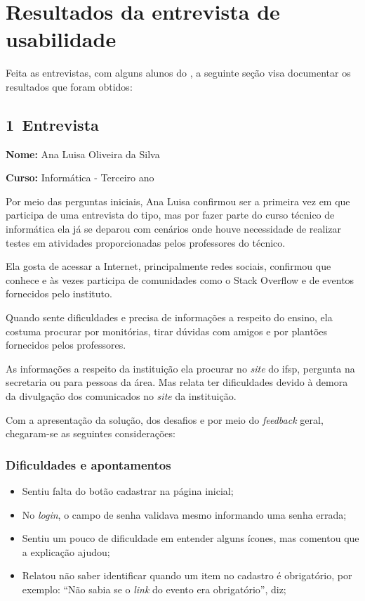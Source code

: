\chapter{Resultados da entrevista de usabilidade}
\label{resultado_entrevista}
Feita as entrevistas, com alguns alunos do , a seguinte seção visa documentar os resultados que foram obtidos:

\section{1\textordfeminine \, Entrevista}

\textbf{Nome:} Ana Luisa Oliveira da Silva

\textbf{Curso:} Informática - Terceiro ano

Por meio das perguntas iniciais, Ana Luisa confirmou ser a primeira vez em que participa de uma entrevista do tipo, mas por fazer parte do curso técnico de informática ela já se deparou com cenários onde houve necessidade de realizar testes em atividades proporcionadas pelos professores do técnico.

Ela gosta de acessar a Internet, principalmente redes sociais, confirmou que conhece e às vezes participa de comunidades como o Stack Overflow e de eventos fornecidos pelo instituto.

Quando sente dificuldades e precisa de informações a respeito do ensino, ela costuma procurar por monitórias, tirar dúvidas com amigos e por plantões fornecidos pelos professores.

As informações a respeito da instituição ela procurar no \textit{site} do \acs{ifsp}, pergunta na secretaria ou para pessoas da área. Mas relata ter dificuldades devido à demora da divulgação dos comunicados no \textit{site} da instituição.

Com a apresentação da solução, dos desafios e por meio do \textit{feedback} geral, chegaram-se as seguintes considerações:

\subsection{Dificuldades e apontamentos}
\begin{itemize}
    \item Sentiu falta do botão cadastrar na página inicial;
    \item No \textit{login}, o campo de senha validava mesmo informando uma senha errada; 
    \item Sentiu um pouco de dificuldade em entender alguns ícones, mas comentou que a explicação ajudou;
    \item Relatou não saber identificar quando um item no cadastro é obrigatório, por exemplo: ``Não sabia se o \textit{link} do evento era obrigatório'', diz; 
\end{itemize}

